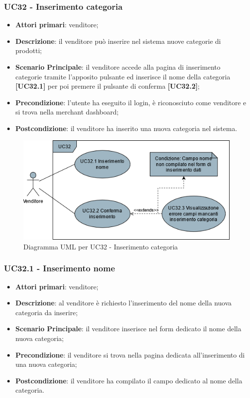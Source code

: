 \subsubsection{UC32 - Inserimento categoria}
\begin{itemize}
\item \textbf{Attori primari}: venditore;
\item \textbf{Descrizione}: il venditore può inserire nel sistema nuove categorie di prodotti;
\item \textbf{Scenario Principale}: il venditore accede alla pagina di inserimento categorie tramite l'apposito pulsante ed inserisce il nome della categoria \textbf{[UC32.1]} per poi premere il pulsante di conferma \textbf{[UC32.2]};
\item \textbf{Precondizione}: l'utente ha eseguito il login, è riconosciuto come venditore e si trova nella merchant dashboard;
\item \textbf{Postcondizione}: il venditore ha inserito una nuova categoria nel sistema.
\end{itemize}

\begin{figure}[H]
\centering
\includegraphics[scale=0.6]{res/UseCase/Immagini/InserimentoCategoria}
\caption{Diagramma UML per UC32 - Inserimento categoria}
\end{figure}

\subsubsection{UC32.1 - Inserimento nome}
\begin{itemize}
\item \textbf{Attori primari}: venditore;
\item \textbf{Descrizione}: al venditore è richiesto l'inserimento del nome della nuova categoria da inserire;
\item \textbf{Scenario Principale}: il venditore inserisce nel form dedicato il nome della nuova categoria;
\item \textbf{Precondizione}: il venditore si trova nella pagina dedicata all'inserimento di una nuova categoria;
\item \textbf{Postcondizione}: il venditore ha compilato il campo dedicato al nome della categoria.
\end{itemize}

